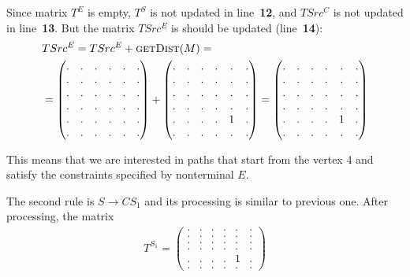 Since matrix $T^E$ is empty, $T^S$ is not updated in line~\textbf{12}, and $TSrc^C$ is not updated in line~\textbf{13}.
But the matrix $TSrc^E$ is should be updated (line~\textbf{14}):
{
    \renewcommand{\arraystretch}{0.7}
    \setlength\arraycolsep{2pt}
\begin{align*}
&TSrc^E = TSrc^E + \textsc{getDist}(M) = \\ &=
\begin{pmatrix}
    . & . & . & . & . & . \\
    . & . & . & . & . & . \\
    . & . & . & . & . & . \\
    . & . & . & . & . & . \\ 
    . & . & . & . & . & . \\ 
    . & . & . & . & . & .
\end{pmatrix} +
\begin{pmatrix}
    . & . & . & . & . & . \\
    . & . & . & . & . & . \\
    . & . & . & . & . & . \\
    . & . & . & . & . & . \\ 
    . & . & . & . & 1 & . \\ 
    . & . & . & . & . & .
\end{pmatrix}= 
\begin{pmatrix}
    . & . & . & . & . & . \\
    . & . & . & . & . & . \\
    . & . & . & . & . & . \\
    . & . & . & . & . & . \\ 
    . & . & . & . & 1 & . \\ 
    . & . & . & . & . & .
\end{pmatrix}
\end{align*}
}

This means that we are interested in paths that start from the vertex 4 and satisfy the constraints specified by nonterminal $E$.

The second rule is $S \to C S_1$ and its processing is similar to previous one.
After processing, the matrix 
{
    \renewcommand{\arraystretch}{0.7}
    \setlength\arraycolsep{2pt}
\begin{align*}
T^{S_1} =
\begin{pmatrix}
    . & . & . & . & . & . \\
    . & . & . & . & . & . \\
    . & . & . & . & . & . \\
    . & . & . & . & . & . \\ 
    . & . & . & . & 1 & . \\ 
    . & . & . & . & . & .
\end{pmatrix}
\end{align*}
}

